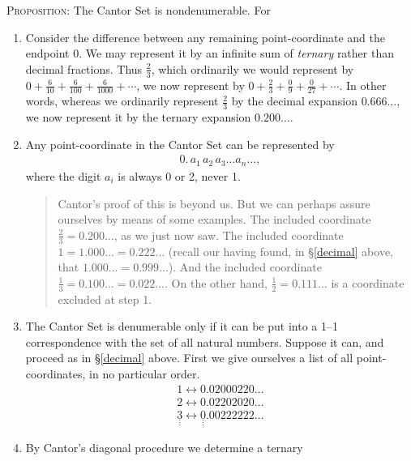 \documentclass[twoside,openright]{article}
\begin{document}
\begin{enumerate}
\begin{enumerate}[A.]
    \textsc{Proposition}: The Cantor Set is
    nondenumerable.\label{CantorSetnonden} For
    \begin{enumerate}[(1)]
    \item Consider the difference between any remaining
      point-coordinate and the endpoint 0. We may represent it by an
      infinite sum of \emph{ternary} rather than decimal
      fractions. Thus $\frac{2}{3}$, which ordinarily we would
      represent by
      $0+\frac{6}{10}+\frac{6}{100}+\frac{6}{1000}+\dotsb$, we now
      represent by $0+\frac{2}{3}+\frac{0}{9}+\frac{0}{27}+\dotsb$. In
      other words, whereas we ordinarily represent $\frac{2}{3}$ by
      the decimal expansion $0.666\dotsc$, we now represent it by the
      ternary expansion $0.200\dotsc$.
    \item Any point-coordinate in the Cantor Set can be represented by
      \begin{align*}
        0.\,a_1\,a_2\,a_3\dotsc a_n\dotsc,
        \end {align*}
        where the digit $a_i$ is always 0 or 2, never 1.
        \begin{quote} {\small Cantor's proof of this is beyond us. But
            we can perhaps assure ourselves by means of some
            examples. The included coordinate
            $\frac{2}{3}=0.200\dotsc$, as we just now saw. The
            included coordinate $1=1.000\dotsc=0.222\dotsc$ (recall
            our having found, in \S\ref{decimal} above, that
            $1.000\dotsc=0.999\dotsc$). And the included coordinate
            $\frac{1}{3}=0.100\dotsc = 0.022\dotsc$. On the other
            hand, $\frac{1}{2}=0.111\dotsc$ is a coordinate excluded
            at step 1.}
        \end{quote}
      \item The Cantor Set is denumerable only if it can be put into a
        1--1 correspondence with the set of all natural
        numbers. Suppose it can, and proceed as in \S\ref{decimal}
        above. First we give ourselves a list of all
        point-coordinates, in no particular order.
        \begin{align*}
          1\leftrightarrow0.02000220\dotsc \\
          2\leftrightarrow0.02202020\dotsc \\
          \underset{\vdots}{3}\leftrightarrow\underset{\vdots}{0}.00222222\dotsc
        \end{align*}
      \item By Cantor's diagonal procedure we determine a ternary

\end{enumerate}
\end{enumerate}
\end{enumerate}
\end{document}
